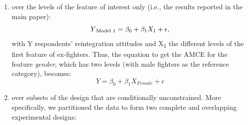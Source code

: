 \begin{enumerate}[noitemsep]
\item over the levels of the feature of interest only (i.e., the results reported in the main paper):
\begin{equation*}
Y\textsubscript{\text{Model 1}} = \beta_{0} + \beta_{1}X_{1} + \epsilon,
\end{equation*}
\newpage
with Y respondents' reintegration attitudes and X\textsubscript{1} the different levels of the first feature of ex-fighters. Thus, the equation to get the AMCE for the feature \textit{gender}, which has two levels (with male fighters as the reference category), becomes: 
\begin{equation*}
Y = \beta_{0} + \beta_{1}X_{Female} + \epsilon
\end{equation*}

\item over subsets of the design that are conditionally unconstrained. More specifically, we partitioned the data to form two complete and overlapping experimental designs:


\end{enumerate}
